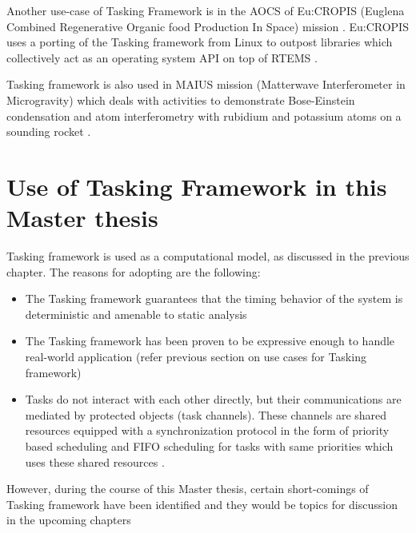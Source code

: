 Another use-case of Tasking Framework is in the AOCS of Eu:CROPIS (Euglena Combined Regenerative Organic food Production In Space) mission \cite{TETtoEUCROPIS}. Eu:CROPIS uses a porting of the Tasking framework from Linux to outpost libraries which collectively act as an operating system API on top of RTEMS \cite{TETtoEUCROPIS}.

Tasking framework is also used in MAIUS mission (Matterwave Interferometer in Microgravity) which deals with activities to demonstrate Bose-Einstein condensation and atom interferometry with rubidium and potassium atoms on a sounding rocket \cite{TETtoEUCROPIS}\cite{MAIUS}.

\section{Use of Tasking Framework in this Master thesis}
Tasking framework is used as a computational model, as discussed in the previous chapter. The reasons for adopting are the following:

\begin{itemize}
\item The Tasking framework guarantees that the timing behavior of the system is deterministic and amenable to static analysis
\item The Tasking framework has been proven to be expressive enough to handle real-world application (refer previous section on use cases for Tasking framework)
\item Tasks do not interact with each other directly, but their communications are mediated by protected objects (task channels). These channels are shared resources equipped with a synchronization protocol in the form of priority based scheduling and FIFO scheduling for tasks with same priorities which uses these shared resources \cite{TaskFr}.  
\end{itemize}  

However, during the course of this Master thesis, certain short-comings of Tasking framework have been identified and they would be topics for discussion in the upcoming chapters

             



          